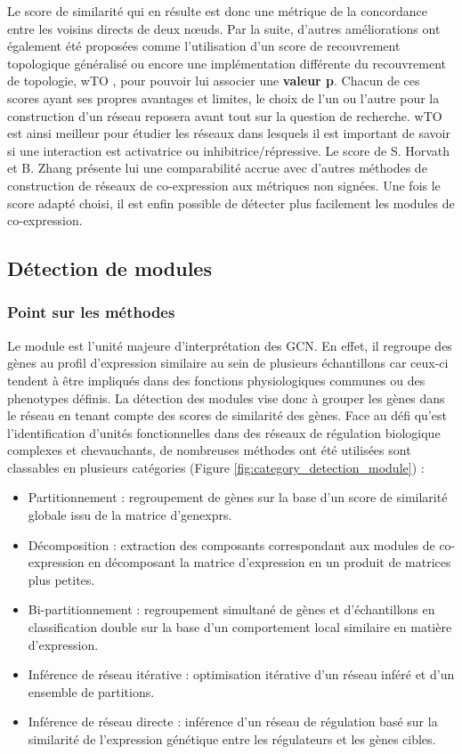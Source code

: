 Le score de similarité qui en résulte est donc une métrique de la concordance entre les voisins directs de deux nœuds. Par la suite, d'autres améliorations ont également été proposées comme l'utilisation d'un score de recouvrement topologique généralisé \cite{Yip2007Dec} ou encore une implémentation différente du recouvrement de topologie, wTO \cite{Gysi2018}, pour pouvoir lui associer une \textbf{valeur p}. Chacun de ces scores ayant ses propres avantages et limites, le choix de l'un ou l'autre pour la construction d'un réseau reposera avant tout sur la question de recherche. wTO est ainsi meilleur pour étudier les réseaux dans lesquels il est important de savoir si une interaction est activatrice ou inhibitrice/répressive. Le score de S. Horvath et B. Zhang présente lui une comparabilité accrue avec d'autres méthodes de construction de réseaux de co-expression aux métriques non signées. Une fois le score adapté choisi, il est enfin possible de détecter plus facilement les modules de co-expression.



\subsection{Détection de modules}

\subsubsection{Point sur les méthodes}

Le module est l'unité majeure d'interprétation des \acrshort{GCN}. En effet, il regroupe des gènes au profil d'expression similaire au sein de plusieurs échantillons car ceux-ci tendent à être impliqués dans des fonctions physiologiques communes ou des \glspl{phenotype} définis. La détection des modules vise donc à grouper les gènes dans le réseau en tenant compte des scores de similarité des gènes. Face au défi qu'est l'identification d'unités fonctionnelles dans des réseaux de régulation biologique complexes et chevauchants, de nombreuses méthodes ont été utilisées sont classables en plusieurs catégories (Figure \ref{fig:category_detection_module}) \cite{Saelens2018} : 
\begin{itemize}
    \item Partitionnement : regroupement de gènes sur la base d'un score de similarité globale issu de la matrice d'\glspl{genexpr}.
    \item Décomposition : extraction des composants correspondant aux modules de co-expression en décomposant la matrice d'expression en un produit de matrices plus petites.
    \item Bi-partitionnement : regroupement simultané de gènes et d'échantillons en classification double sur la base d'un comportement local similaire en matière d'expression.
    \item Inférence de réseau itérative : optimisation itérative d'un réseau inféré et d'un ensemble de partitions.
    \item Inférence de réseau directe : inférence d'un réseau de régulation basé sur la similarité de l'expression génétique entre les régulateurs et les gènes cibles.
\end{itemize} 
\hfill

